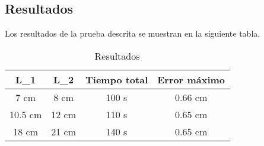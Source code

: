 \subsection{Resultados}

Los resultados de la prueba descrita se muestran en la siguiente tabla.

\begin{table}[ht]
	\centering
	\begin{tabular}{|c|c|c|c|}
		\hline
		\textbf{L\_1} & \textbf{L\_2} & \textbf{Tiempo total} & \textbf{Error máximo} \\
		\hline
		7 cm  & 8 cm  & 100 s & 0.66 cm \\
		10.5 cm & 12 cm & 110 s & 0.65 cm \\
		18 cm  & 21 cm & 140 s & 0.65 cm \\
		\hline
	\end{tabular}
	\caption{Resultados}
\end{table}